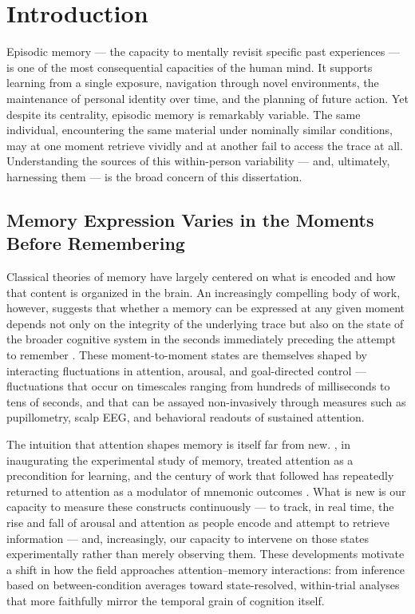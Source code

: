 \chapter{Introduction}\label{ch:introduction}

Episodic memory --- the capacity to mentally revisit specific past experiences --- is one of the most consequential capacities of the human mind. It supports learning from a single exposure, navigation through novel environments, the maintenance of personal identity over time, and the planning of future action. Yet despite its centrality, episodic memory is remarkably variable. The same individual, encountering the same material under nominally similar conditions, may at one moment retrieve vividly and at another fail to access the trace at all. Understanding the sources of this within-person variability --- and, ultimately, harnessing them --- is the broad concern of this dissertation.

\section{Memory Expression Varies in the Moments Before Remembering}

Classical theories of memory have largely centered on what is encoded and how that content is organized in the brain. An increasingly compelling body of work, however, suggests that whether a memory can be expressed at any given moment depends not only on the integrity of the underlying trace but also on the state of the broader cognitive system in the seconds immediately preceding the attempt to remember \parencite{madore2020memory,madore2022readiness}. These moment-to-moment states are themselves shaped by interacting fluctuations in attention, arousal, and goal-directed control --- fluctuations that occur on timescales ranging from hundreds of milliseconds to tens of seconds, and that can be assayed non-invasively through measures such as pupillometry, scalp EEG, and behavioral readouts of sustained attention.

The intuition that attention shapes memory is itself far from new. \textcite{ebbinghaus1885memory}, in inaugurating the experimental study of memory, treated attention as a precondition for learning, and the century of work that followed has repeatedly returned to attention as a modulator of mnemonic outcomes \parencite{baddeley1984attention,craik1996effects}. What is new is our capacity to measure these constructs continuously --- to track, in real time, the rise and fall of arousal and attention as people encode and attempt to retrieve information --- and, increasingly, our capacity to intervene on those states experimentally rather than merely observing them. These developments motivate a shift in how the field approaches attention--memory interactions: from inference based on between-condition averages toward state-resolved, within-trial analyses that more faithfully mirror the temporal grain of cognition itself.

